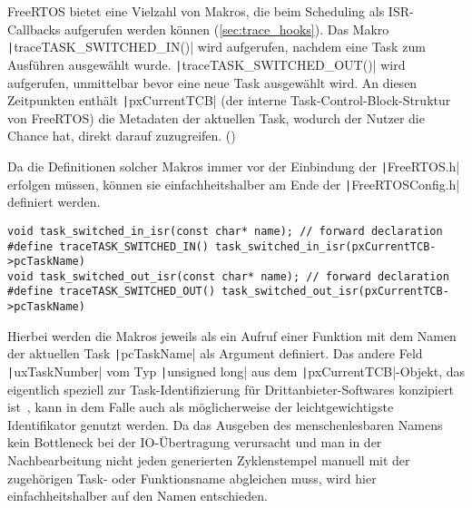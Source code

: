 FreeRTOS bietet eine Vielzahl von Makros, die beim Scheduling als ISR-Callbacks
aufgerufen werden können (\ref{sec:trace_hooks}). Das Makro
\texttt|traceTASK_SWITCHED_IN()| wird aufgerufen, nachdem eine Task zum
Ausführen ausgewählt wurde. \texttt|traceTASK_SWITCHED_OUT()| wird
aufgerufen, unmittelbar bevor eine neue Task ausgewählt wird. An diesen
Zeitpunkten enthält \texttt|pxCurrentTCB| (der interne
Task-Control-Block-Struktur von FreeRTOS) die Metadaten der aktuellen Task,
wodurch der Nutzer die Chance hat, direkt darauf zuzugreifen.
(\cite{freertos_rtos_trace_hooks})

Da die Definitionen solcher Makros immer vor der Einbindung der
\texttt|FreeRTOS.h| erfolgen müssen, können sie einfachheitshalber
am Ende der \texttt|FreeRTOSConfig.h| definiert werden.

\begin{code}
\begin{verbatim}
void task_switched_in_isr(const char* name); // forward declaration
#define traceTASK_SWITCHED_IN() task_switched_in_isr(pxCurrentTCB->pcTaskName)
void task_switched_out_isr(const char* name); // forward declaration
#define traceTASK_SWITCHED_OUT() task_switched_out_isr(pxCurrentTCB->pcTaskName)
\end{verbatim}
\end{code}

Hierbei werden die Makros jeweils als ein Aufruf einer Funktion mit dem Namen
der aktuellen Task \texttt|pcTaskName| als Argument definiert. Das
andere Feld \texttt|uxTaskNumber| vom Typ \texttt|unsigned
long| aus dem \texttt|pxCurrentTCB|-Objekt, das eigentlich speziell zur
Task-Identifizierung für Drittanbieter-Softwares konzipiert
ist~\cite{freertos_task_c_410}, kann in dem Falle auch als möglicherweise der
leichtgewichtigste Identifikator genutzt werden. Da das Ausgeben des
menschenlesbaren Namens kein Bottleneck bei der IO-Übertragung verursacht und
man in der Nachbearbeitung nicht jeden generierten Zyklenstempel manuell mit der
zugehörigen Task- oder Funktionsname abgleichen muss, wird hier
einfachheitshalber auf den Namen entschieden.

